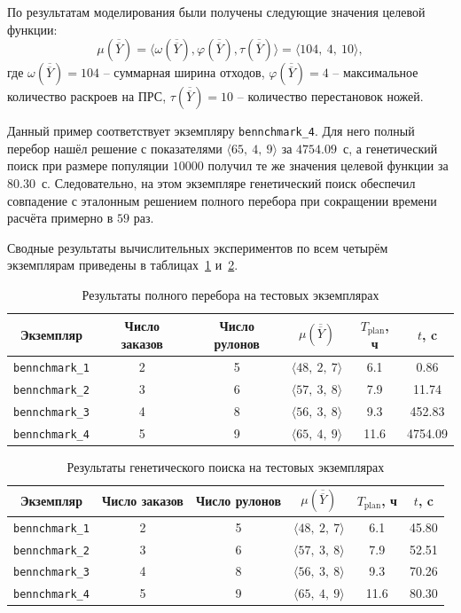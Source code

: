 По результатам моделирования были получены следующие значения целевой функции:
\[
\mu(\overline{\overline{Y}}) = \langle \omega(\overline{\overline{Y}}),\varphi(\overline{\overline{Y}}),\tau(\overline{\overline{Y}}) \rangle = \langle 104,\ 4,\ 10 \rangle,
\]
где $\omega(\overline{\overline{Y}})=104$ -- суммарная ширина отходов, $\varphi(\overline{\overline{Y}})=4$ -- максимальное количество раскроев на ПРС, $\tau(\overline{\overline{Y}})=10$ -- количество перестановок ножей.

Данный пример соответствует экземпляру \texttt{bennchmark\_4}.
Для него полный перебор нашёл решение с показателями $\langle 65,\ 4,\ 9 \rangle$ за $4754.09$~с, а генетический поиск при размере популяции $10000$ получил те же значения целевой функции за $80.30$~с.
Следовательно, на этом экземпляре генетический поиск обеспечил совпадение с эталонным решением полного перебора при сокращении времени расчёта примерно в $59$ раз.

Сводные результаты вычислительных экспериментов по всем четырём экземплярам приведены в таблицах~\ref{tab:benchmark_full_enumeration} и~\ref{tab:benchmark_genetic_search}.


\begin{table}[htbp]
\centering
\caption{Результаты полного перебора на тестовых экземплярах}
\label{tab:benchmark_full_enumeration}
\begin{tabular}{|c|c|c|c|c|c|}
\hline
Экземпляр & Число заказов & Число рулонов & $\mu(\overline{\overline{Y}})$ & $T_{\mathrm{plan}}$, ч & $t$, c \\
\hline
\texttt{bennchmark\_1} & 2 & 5 & $\langle 48,\ 2,\ 7 \rangle$ & 6.1 & 0.86 \\
\hline
\texttt{bennchmark\_2} & 3 & 6 & $\langle 57,\ 3,\ 8 \rangle$ & 7.9 & 11.74 \\
\hline
\texttt{bennchmark\_3} & 4 & 8 & $\langle 56,\ 3,\ 8 \rangle$ & 9.3 & 452.83 \\
\hline
\texttt{bennchmark\_4} & 5 & 9 & $\langle 65,\ 4,\ 9 \rangle$ & 11.6 & 4754.09 \\
\hline
\end{tabular}
\end{table}

\begin{table}[htbp]
\centering
\caption{Результаты генетического поиска на тестовых экземплярах}
\label{tab:benchmark_genetic_search}
\begin{tabular}{|c|c|c|c|c|c|}
\hline
Экземпляр & Число заказов & Число рулонов & $\mu(\overline{\overline{Y}})$ & $T_{\mathrm{plan}}$, ч & $t$, c \\
\hline
\texttt{bennchmark\_1} & 2 & 5 & $\langle 48,\ 2,\ 7 \rangle$ & 6.1 & 45.80 \\
\hline
\texttt{bennchmark\_2} & 3 & 6 & $\langle 57,\ 3,\ 8 \rangle$ & 7.9 & 52.51 \\
\hline
\texttt{bennchmark\_3} & 4 & 8 & $\langle 56,\ 3,\ 8 \rangle$ & 9.3 & 70.26 \\
\hline
\texttt{bennchmark\_4} & 5 & 9 & $\langle 65,\ 4,\ 9 \rangle$ & 11.6 & 80.30 \\
\hline
\end{tabular}
\end{table}

